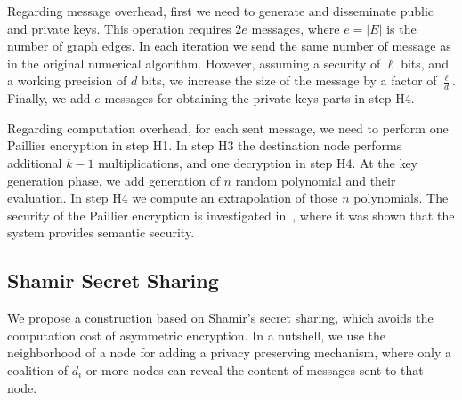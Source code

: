 \documentclass[times, 10pt,twocolumn]{article}
\begin{document}
Regarding message overhead, first we need to generate and
disseminate public and private keys. This operation requires $2e$
messages, where $e = |E|$ is the number of graph edges. In each
iteration we send the same number of message as in the original
numerical algorithm. However, assuming a security of $\ell$ bits,
and a working precision of $d$ bits, we increase the size of the
message by a factor of $\frac{ \ell}{d}$. Finally, we add $e$
messages for obtaining the private keys parts in step H4.

Regarding computation overhead, for each sent message, we need to
perform one Paillier encryption in step H1. In step H3 the
destination node performs additional $k-1$ multiplications, and
one decryption in step H4. At the key generation phase, we add
generation of $n$ random polynomial and their evaluation. In step
H4 we compute an extrapolation of those $n$ polynomials.
The security of the Paillier encryption is investigated
in~\cite{Paillier, Paillier2}, where it was shown that the system
provides semantic security.

\subsection{Shamir Secret Sharing}
We propose a  construction based on Shamir's secret sharing,
which avoids the computation cost of asymmetric encryption. In a
nutshell, we use the neighborhood of a node for adding a privacy
preserving mechanism, where only a coalition of $d_i$ or more nodes
can reveal the content of messages sent to that node.
\end{document}
